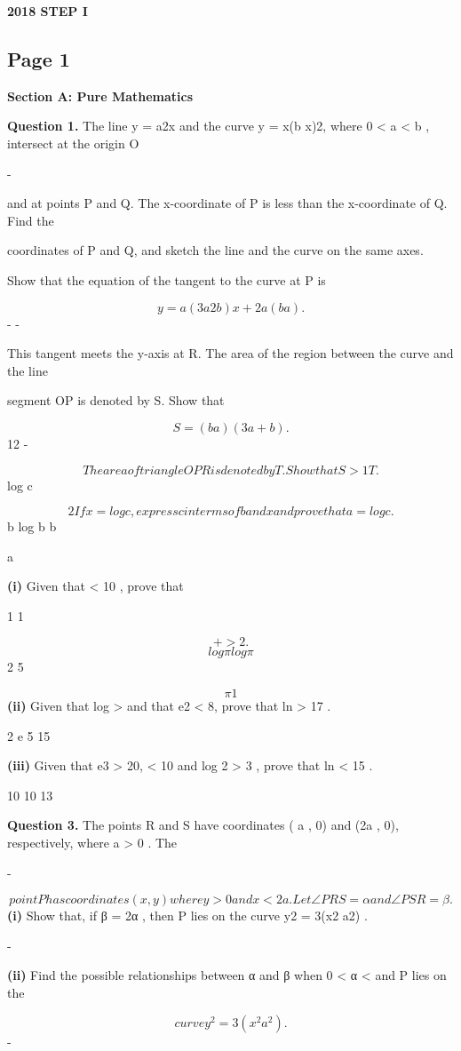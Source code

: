 \documentclass[12pt]{article}
\begin{document}
\begin{center}
{\Large \textbf{2018 STEP I}}
\end{center}

\subsection*{Page 1}
\begin{flushleft}
\bigskip\textbf{Section A: Pure Mathematics}\par
\bigskip\textbf{Question 1.} The line y = a2x and the curve y = x(b x)2, where 0 < a < b , intersect at the origin O\par
-\par
and at points P and Q. The x-coordinate of P is less than the x-coordinate of Q. Find the\par
coordinates of P and Q, and sketch the line and the curve on the same axes.\par
Show that the equation of the tangent to the curve at P is\par
\[y = a(3a 2b)x + 2a(b a) .\]
- -\par
This tangent meets the y-axis at R. The area of the region between the curve and the line\par
segment OP is denoted by S. Show that\par
\[S = (b a) (3a + b) .\]
12 -\par
\[The area of triangle OP R is denoted by T . Show that S > 1 T .\]
log c\par
\[2 If x = log c , express c in terms of b and x and prove that a = log c .\]
b log b b\par
a\par
\textbf{(i)} Given that  < 10 , prove that\par
1 1\par
\[+ > 2 .\]
\[log \pi log \pi\]
2 5\par
\[\pi 1\]
\textbf{(ii)} Given that log > and that e2 < 8, prove that ln \pi > 17 .\par
2 e 5 15\par
\textbf{(iii)} Given that e3 > 20,  < 10 and log 2 > 3 , prove that ln \pi < 15 .\par
10 10 13\par
\bigskip\textbf{Question 3.} The points R and S have coordinates ( a , 0) and (2a , 0), respectively, where a > 0 . The\par
-\par
\[point P has coordinates (x , y) where y > 0 and x < 2a . Let ∠P RS = α and ∠P SR = β .\]
\textbf{(i)} Show that, if β = 2α , then P lies on the curve y2 = 3(x2 a2) .\par
-\par
\textbf{(ii)} Find the possible relationships between α and β when 0 < α < \pi and P lies on the\par
\[curve y^2 = 3(x^2 a^2) .\]
-\par
\end{flushleft}
\end{document}
